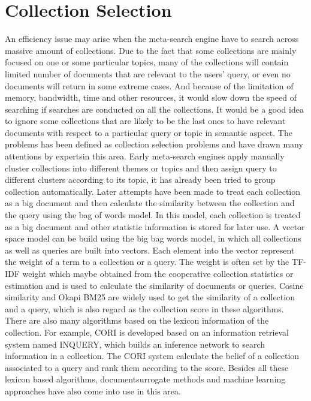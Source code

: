 \section{Collection Selection}
An efficiency issue may arise when the meta-search engine have to search across massive amount of collections. Due to the fact that some collections are mainly focused on one or some particular topics, many of the collections will contain limited number of documents that are relevant to the users' query, or even no documents will return in some extreme
cases. And because of the limitation of memory, bandwidth, time and other resources, it would slow down the speed of searching if searches are conducted on all the collections. It would be a good idea to ignore some collections that are likely to be the last ones to have relevant documents with respect to a particular query or topic in semantic aspect. The problems has been defined as collection selection problems and have drawn many attentions by expertsin this area. Early meta-search engines apply manually cluster collections into different themes or topics and then assign query to different clusters according to its topic, it has already been tried to group collection automatically\cite{Danzig1991}. Later attempts have been made to treat each collection as a big document and then calculate the similarity between the collection and the query using the bag of words model. In this model, each collection is treated as a big document and other statistic information is stored for later use. A vector space model can be build using the big bag words model, in which all collections as well as queries are built into vectors. Each element into the vector represent the weight of a term to a collection or a query. The weight is often set by the TF-IDF weight which maybe obtained from the cooperative collection statistics or estimation and is used to calculate the similarity of documents or queries. Cosine similarity and Okapi BM25\cite{Robertson1994} are widely used to get the similarity of a collection and a query, which is also regard as the collection score in these algorithms. There are also many algorithms based on the lexicon information of the collection. For example, CORI\cite{Callan1995,Callan2000} is developed based on an information retrieval system named INQUERY\cite{Callan1992}, which builds an inference network to search information in a collection. The CORI system calculate the belief of a collection associated to a query and rank them according to the score. Besides all these lexicon based algorithms, documentsurrogate methods\cite{Si2003,Shokouhi2007,Thomas2009} and machine learning approaches \cite{Voorhees1995}have also come into use in this area.

